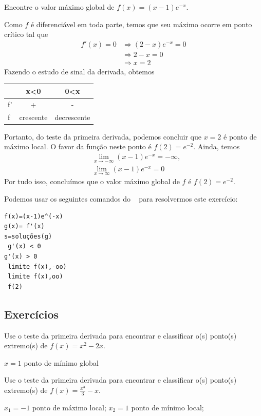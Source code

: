\cleardoublepage\documentclass[../main.tex]{subfiles}
\begin{document}
\begin{exeresol}
  Encontre o valor máximo global de $f(x) = (x-1)e^{-x}$.
\end{exeresol}
\begin{resol}
  Como $f$ é diferenciável em toda parte, temos que seu máximo ocorre em ponto crítico tal que
  \begin{align*}
    f'(x) = 0 &\Rightarrow (2-x)e^{-x} = 0 \\
              &\Rightarrow 2-x = 0 \\
              &\Rightarrow x = 2
  \end{align*}
  Fazendo o estudo de sinal da derivada, obtemos
  \begin{center}
    \begin{tabular}[H]{lcc}
         & x<0 & 0<x \\\hline
      f' & + & - \\
      f  & crescente & decrescente \\\hline
    \end{tabular}
  \end{center}
  Portanto, do teste da primeira derivada, podemos concluir que $x=2$ é ponto de máximo local. O favor da função neste ponto é $f(2) = e^{-2}$. Ainda, temos
  \begin{align*}
    &\lim_{x\to -\infty} (x-1)e^{-x} = -\infty, \\
    &\lim_{x\to \infty} (x-1)e^{-x} = 0
  \end{align*}
  Por tudo isso, concluímos que o valor máximo global de $f$ é $f(2) = e^{-2}$.

  Podemos usar os seguintes comandos do \geogebra~ para resolvermos este exercício:
\begin{verbatim}
f(x)=(x-1)e^(-x)
g(x)= f'(x)
s=soluções(g)
 g'(x) < 0
g'(x) > 0
 limite f(x),-oo)
 limite f(x),oo)
 f(2)
\end{verbatim}
\end{resol}
\subsection{Exercícios}
\begin{exer}
  Use o teste da primeira derivada para encontrar e classificar o(s) ponto(s) extremo(s) de $f(x) = x^2 - 2x$.
\end{exer}
\begin{resp}
  $x=1$ ponto de mínimo global
\end{resp}

\begin{exer}
    Use o teste da primeira derivada para encontrar e classificar o(s) ponto(s) extremo(s) de $\displaystyle f(x) = \frac{x^3}{3}-x$.
\end{exer}
\begin{resp}
  $x_1=-1$ ponto de máximo local; $x_2=1$ ponto de mínimo local;
\end{resp}
\end{document}
